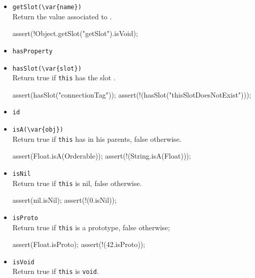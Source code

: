\begin{itemize}
\item \lstinline|getSlot(\var{name})|\\
  Return the value associated to .

\begin{urbiscript}[firstnumber=last]
assert(!Object.getSlot("getSlot").isVoid);
\end{urbiscript}

\item \lstinline|hasProperty|\\

\item \lstinline|hasSlot(\var{slot})|\\
  Return true if \lstinline|this| has the slot .

\begin{urbiscript}[firstnumber=last]
assert(hasSlot("connectionTag"));
assert(!(hasSlot("thisSlotDoesNotExist")));
\end{urbiscript}

\item \lstinline|id|\\

\item \lstinline|isA(\var{obj})|\\
  Return true if \lstinline|this| has  in his parents, false
  otherwise.

\begin{urbiscript}[firstnumber=last]
assert(Float.isA(Orderable));
assert(!(String.isA(Float)));
\end{urbiscript}

\item \lstinline|isNil|\\
  Return true if \lstinline|this| is nil, false otherwise.

\begin{urbiscript}[firstnumber=last]
assert(nil.isNil);
assert(!(0.isNil));
\end{urbiscript}

\item \lstinline|isProto|\\
  Return true if \lstinline|this| is a prototype, false otherwise;

\begin{urbiscript}[firstnumber=last]
assert(Float.isProto);
assert(!(42.isProto));
\end{urbiscript}

\item \lstinline|isVoid|\\
  Return true if \lstinline|this| is \lstinline|void|.


\end{itemize}
